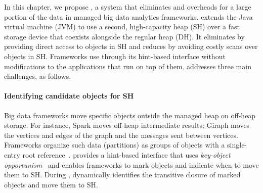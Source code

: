 
In this chapter, we propose \teraheapName{}, a system that eliminates \teraheapSD and \teraheapGC overheads for a large portion of the data in managed big data analytics frameworks.
\teraheapName{} extends the Java virtual machine (JVM) to use a second, high-capacity heap (SH) over a fast storage device that coexists alongside the regular heap (DH).
It eliminates \teraheapSD by providing direct access to objects in SH and reduces \teraheapGC by avoiding costly \teraheapGC scans over objects in SH.
Frameworks use \teraheapName{} through its hint-based interface without modifications to the applications that run on top of them.
\teraheapName{} addresses three main challenges, as follows.

\paragraph{\textbf{Identifying candidate objects for SH}}
%
Big data frameworks move specific objects outside the managed heap on off-heap storage.
For instance, Spark moves off-heap intermediate results; Giraph moves the vertices and edges of the graph and the messages sent between vertices.
Frameworks organize such data (partitions) as groups of objects with a single-entry root reference~\cite{mahmud:survey}.
\teraheapName{} provides a hint-based interface that uses \emph{key-object opportunism}~\cite{hayes:key_opport} and enables frameworks to mark objects and indicate when to move them to SH.
During \teraheapGC, \teraheapName{} dynamically identifies the transitive closure of marked objects and move them to SH.

